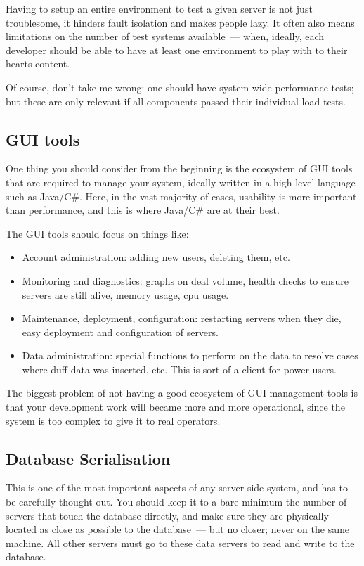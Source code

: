 \documentclass{memoir}
\begin{document}
Having to setup an entire environment to test a given server is not
just troublesome, it hinders fault isolation and makes people lazy. It
often also means limitations on the number of test systems
available~--- when, ideally, each developer should be able to have at
least one environment to play with to their hearts content.

Of course, don't take me wrong: one should have system-wide
performance tests; but these are only relevant if all components
passed their individual load tests.

\subsection{GUI tools}

One thing you should consider from the beginning is the ecosystem of
GUI tools that are required to manage your system, ideally written in
a high-level language such as Java/C\#. Here, in the vast majority of
cases, usability is more important than performance, and this is where
Java/C\# are at their best.

The GUI tools should focus on things like:

\begin{itemize}
\item Account administration: adding new users, deleting them, etc.
\item Monitoring and diagnostics: graphs on deal volume, health checks
  to ensure servers are still alive, memory usage, cpu usage.
\item Maintenance, deployment, configuration: restarting servers when
  they die, easy deployment and configuration of servers.
\item Data administration: special functions to perform on the data to
  resolve cases where duff data was inserted, etc. This is sort of a
  client for power users.
\end{itemize}

The biggest problem of not having a good ecosystem of GUI management
tools is that your development work will became more and more
operational, since the system is too complex to give it to real
operators.

\subsection{Database Serialisation}

This is one of the most important aspects of any server side system,
and has to be carefully thought out. You should keep it to a bare
minimum the number of servers that touch the database directly, and
make sure they are physically located as close as possible to the
database~--- but no closer; never on the same machine. All other
servers must go to these data servers to read and write to the
database.
\end{document}
